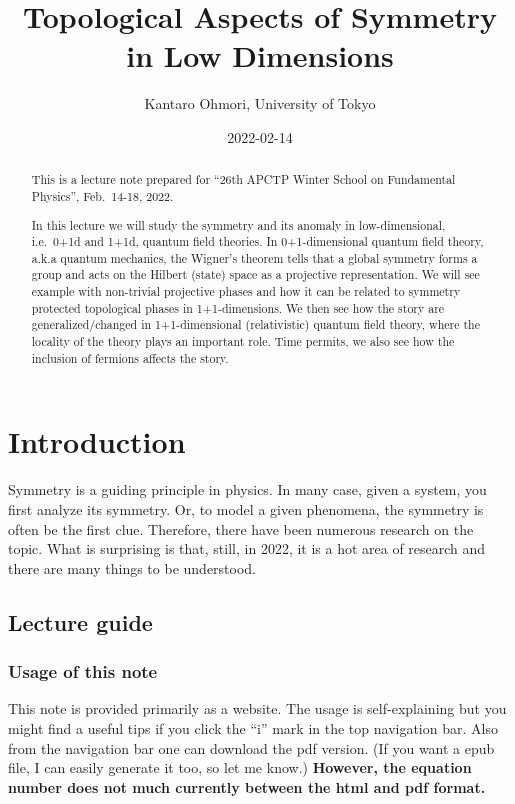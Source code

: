 \documentclass[
]{scrartcl}
\title{Topological Aspects of Symmetry in Low Dimensions}
\author{Kantaro Ohmori, University of Tokyo}
\date{2022-02-14}
\numberwithin{equation}{section}
\theoremstyle{definition}
\theoremstyle{definition}
\theoremstyle{definition}
\theoremstyle{definition}
\theoremstyle{remark}
\begin{document}
\maketitle
\begin{abstract}
This is a lecture note prepared for ``26th APCTP Winter School on Fundamental Physics'', Feb.~14-18, 2022.

In this lecture we will study the symmetry and its anomaly in low-dimensional, i.e.~0+1d and 1+1d, quantum field theories.
In 0+1-dimensional quantum field theory, a.k.a quantum mechanics, the Wigner's theorem tells that a global symmetry forms a group and acts on the Hilbert (state) space as a projective representation. We will see example with non-trivial projective phases and how it can be related to symmetry protected topological phases in 1+1-dimensions. We then see how the story are generalized/changed in 1+1-dimensional (relativistic) quantum field theory, where the locality of the theory plays an important role.
Time permits, we also see how the inclusion of fermions affects the story.
\end{abstract}

{
\setcounter{tocdepth}{2}
\tableofcontents
}
\hypertarget{introduction}{%
\section{Introduction}\label{introduction}}

Symmetry is a guiding principle in physics. In many case, given a system, you first analyze its symmetry. Or, to model a given phenomena, the symmetry is often be the first clue.
Therefore, there have been numerous research on the topic. What is surprising is that, still, in 2022, it is a hot area of research and there are many things to be understood.

\hypertarget{lecture-guide}{%
\subsection{Lecture guide}\label{lecture-guide}}

\hypertarget{usage-of-this-note}{%
\subsubsection{Usage of this note}\label{usage-of-this-note}}

This note is provided primarily as a website.
The usage is self-explaining but you might find a useful tips if you click the ``i'' mark in the top navigation bar. Also from the navigation bar one can download the pdf version. (If you want a epub file, I can easily generate it too, so let me know.) \textbf{However, the equation number does not much currently between the html and pdf format.}
\end{document}
